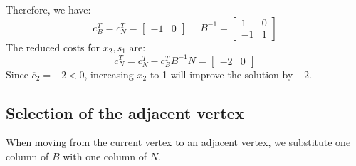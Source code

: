\documentclass[12pt, a4paper]{report}
\begin{document}
\begin{example}
        Therefore, we have:
        \[c_B^T=c_N^T=\begin{bmatrix} -1 & 0 \end{bmatrix} \:\:\:\:\:\: B^{-1}=
        \begin{bmatrix}
            1  & 0  \\
            -1 & 1  
        \end{bmatrix}
        \]
        The reduced costs for $x_2,s_1$ are: 
        \[\overline{c}_N^T=c_N^T-c_B^TB^{-1}N=\begin{bmatrix} -2 & 0 \end{bmatrix}\]
        Since $\overline{c}_2=-2<0$, increasing $x_2$ to 1 will improve the solution by $-2$. 
    \end{example}








    \subsection{Selection of the adjacent vertex}
    When moving from the current vertex to an adjacent vertex, we substitute one column of $B$ with one column of $N$. 
\end{document}
